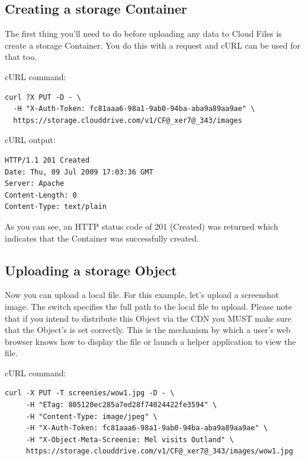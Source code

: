 \documentclass[letterpaper,10pt,english]{manual}
\begin{document}
\subsection{Creating a storage Container}

The first thing you'll need to do before uploading any data to Cloud
Files is create a storage Container.  You do this with a  request
and cURL can be used for that too.

cURL command:

\begin{Verbatim}[commandchars=@\[\]]
curl ?X PUT -D - \
  -H "X-Auth-Token: fc81aaa6-98a1-9ab0-94ba-aba9a89aa9ae" \
  https://storage.clouddrive.com/v1/CF@_xer7@_343/images
\end{Verbatim}

cURL output:

\begin{Verbatim}[commandchars=@\[\]]
HTTP/1.1 201 Created
Date: Thu, 09 Jul 2009 17:03:36 GMT
Server: Apache
Content-Length: 0
Content-Type: text/plain
\end{Verbatim}

As you can see, an HTTP status code of 201 (Created) was returned which
indicates that the Container was successfully created.


\subsection{Uploading a storage Object}

Now you can upload a local file.  For this example, let's upload a
screenshot image.  The  switch specifies the full path to the
local file to upload.  Please note that if you intend to distribute
this Object via the CDN you MUST make sure that the Object's
\code{Content-Type} is set correctly.  This is the mechanism by which
a user's web browser knows how to display the file or launch a
helper application to view the file.

cURL command:

\begin{Verbatim}[commandchars=@\[\]]
curl -X PUT -T screenies/wow1.jpg -D - \
     -H "ETag: 805120ec285a7ed28f74024422fe3594" \
     -H "Content-Type: image/jpeg" \
     -H "X-Auth-Token: fc81aaa6-98a1-9ab0-94ba-aba9a89aa9ae" \
     -H "X-Object-Meta-Screenie: Mel visits Outland" \
     https://storage.clouddrive.com/v1/CF@_xer7@_343/images/wow1.jpg
\end{Verbatim}
\end{document}

